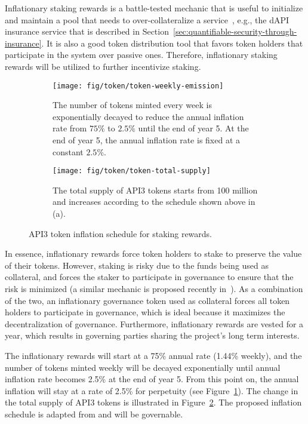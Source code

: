\documentclass[11pt]{article}
\begin{document}
Inflationary staking rewards is a battle-tested mechanic that is useful to initialize and maintain a pool that needs to over-collateralize a service~\cite{synthetix:2020}, e.g., the dAPI insurance service that is described in Section~\ref{sec:quantifiable-security-through-insurance}.
It is also a good token distribution tool that favors token holders that participate in the system over passive ones.
Therefore, inflationary staking rewards will be utilized to further incentivize staking.

\begin{figure}[t]
     \centering
     \begin{subfigure}{0.9\textwidth}
         \centering
         \texttt{[image: fig/token/token-weekly-emission]}
         \caption{The number of tokens minted every week is exponentially decayed to reduce the annual inflation rate from $75\%$ to $2.5\%$ until the end of year 5.
         At the end of year 5, the annual inflation rate is fixed at a constant $2.5\%$.}
         \label{fig:token-emission}
     \end{subfigure}
     \begin{subfigure}{0.9\textwidth}
         \centering
         \texttt{[image: fig/token/token-total-supply]}
         \caption{The total supply of API3 tokens starts from 100 million and increases according to the schedule shown above in (a).}
         \label{fig:total-supply}
     \end{subfigure}
    \caption{API3 token inflation schedule for staking rewards.}
    \label{fig:token}
\end{figure}

In essence, inflationary rewards force token holders to stake to preserve the value of their tokens.
However, staking is risky due to the funds being used as collateral, and forces the staker to participate in governance to ensure that the risk is minimized (a similar mechanic is proposed recently in~\cite{aave}).
As a combination of the two, an inflationary governance token used as collateral forces all token holders to participate in governance, which is ideal because it maximizes the decentralization of governance.
Furthermore, inflationary rewards are vested for a year, which results in governing parties sharing the project’s long term interests.

The inflationary rewards will start at a 75\% annual rate (1.44\% weekly), and the number of tokens minted weekly will be decayed exponentially until annual inflation rate becomes 2.5\% at the end of year 5.
From this point on, the annual inflation will stay at a rate of 2.5\% for perpetuity (see Figure~\ref{fig:token-emission}).
The change in the total supply of API3 tokens is illustrated in Figure~\ref{fig:total-supply}.
The proposed inflation schedule is adapted from \cite{sip-24} and will be governable.
\end{document}
